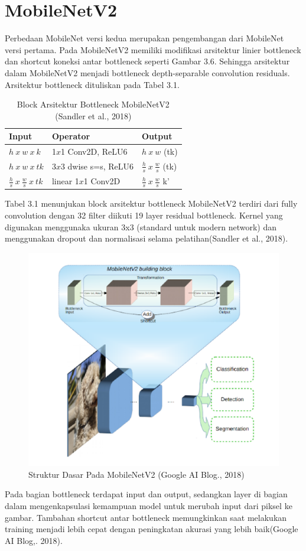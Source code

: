 \section{MobileNetV2}
Perbedaan MobileNet versi kedua merupakan pengembangan dari MobileNet versi pertama. Pada MobileNetV2 memiliki modifikasi arsitektur linier bottleneck dan shortcut koneksi antar bottleneck seperti Gambar 3.6.
Sehingga arsitektur dalam MobileNetV2 menjadi bottleneck depth-separable convolution residuals. Arsitektur bottleneck dituliskan pada Tabel 3.1.
\begin{table}[H]
	\caption{Block Arsitektur Bottleneck MobileNetV2 (Sandler et al., 2018)}
	\vspace{0.2cm}
	\centering
	\begin{tabular}{|p{3cm}|p{4cm}|p{3cm}|}
		\hline
		Input & Operator & Output \\
		\hline
		$h \ x \ w \ x \ k$ & 1$x$1 Conv2D, ReLU6 & $h \ x \ w$ (tk) \\ 
		\hline	
		$h \ x \ w \ x \ tk$ & 3$x$3 dwise s=s, ReLU6 & $\frac{h}{s} \ x \ \frac{w}{s}$ (tk) \\ 
		\hline	
		$\frac{h}{s} \ x \ \frac{w}{s} \ x \ tk$ & linear 1$x$1 Conv2D & $\frac{h}{s} \ x \ \frac{w}{s}$ k' \\ 
		\hline				
	\end{tabular}
\end{table}
Tabel 3.1 menunjukan block arsitektur bottleneck MobileNetV2 terdiri dari fully convolution dengan 32 filter diikuti 19 layer residual bottleneck.
Kernel yang digunakan menggunaka ukuran 3x3 (standard untuk modern network) dan menggunakan dropout dan normalisasi selama pelatihan(Sandler et al., 2018). 
\begin{figure}[H]
	\centering
	\includegraphics[width=0.6\linewidth]{"arsitektur"}
	\caption{Struktur Dasar Pada MobileNetV2 (Google AI Blog., 2018)}
	\label{fig:arsitektur}
\end{figure}
\noindent Pada bagian bottleneck terdapat input dan output, sedangkan layer di bagian dalam mengenkapsulasi kemampuan model untuk merubah input dari piksel ke gambar. Tambahan shortcut antar bottleneck memungkinkan saat melakukan training menjadi lebih cepat dengan peningkatan akurasi yang lebih baik(Google AI Blog,. 2018).
